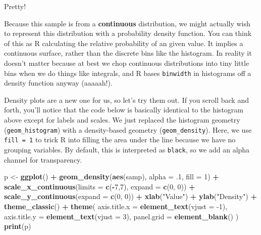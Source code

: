 \documentclass[
]{book}
\newenvironment{Shaded}{\begin{snugshade}}{\end{snugshade}}
\newcommand{\DataTypeTok}[1]{\textcolor[rgb]{0.13,0.29,0.53}{#1}}
\newcommand{\DecValTok}[1]{\textcolor[rgb]{0.00,0.00,0.81}{#1}}
\newcommand{\FloatTok}[1]{\textcolor[rgb]{0.00,0.00,0.81}{#1}}
\newcommand{\KeywordTok}[1]{\textcolor[rgb]{0.13,0.29,0.53}{\textbf{#1}}}
\newcommand{\NormalTok}[1]{#1}
\newcommand{\OperatorTok}[1]{\textcolor[rgb]{0.81,0.36,0.00}{\textbf{#1}}}
\newcommand{\StringTok}[1]{\textcolor[rgb]{0.31,0.60,0.02}{#1}}
\begin{document}
Pretty!

Because this sample is from a \textbf{continuous} distribution, we might actually wish to represent this distribution with a probability density function. You can think of this as R calculating the relative probability of an given value. It implies a continuous surface, rather than the discrete bins like the histogram. In reality it doesn't matter because at best we chop continuous distributions into tiny little bins when we do things like integrals, and R bases \texttt{binwidth} in histograms off a density function anyway (aaaaah!).

Density plots are a new one for us, so let's try them out. If you scroll back and forth, you'll notice that the code below is basically identical to the histogram above except for labels and scales. We just replaced the histogram geometry (\texttt{geom\_histogram}) with a density-based geometry (\texttt{geom\_density}). Here, we use \texttt{fill\ =\ 1} to trick R into filling the area under the line because we have no grouping variables. By default, this is interpreted as \texttt{\textquotesingle{}black\textquotesingle{}}, so we add an alpha channel for transparency.

\begin{Shaded}
\begin{Highlighting}[]
\NormalTok{p <-}\StringTok{ }\KeywordTok{ggplot}\NormalTok{() }\OperatorTok{+}\StringTok{ }
\StringTok{  }\KeywordTok{geom_density}\NormalTok{(}\KeywordTok{aes}\NormalTok{(samp), }\DataTypeTok{alpha =} \FloatTok{.1}\NormalTok{, }\DataTypeTok{fill =} \DecValTok{1}\NormalTok{) }\OperatorTok{+}\StringTok{ }
\StringTok{  }\KeywordTok{scale_x_continuous}\NormalTok{(}\DataTypeTok{limits =} \KeywordTok{c}\NormalTok{(}\OperatorTok{-}\DecValTok{7}\NormalTok{,}\DecValTok{7}\NormalTok{), }\DataTypeTok{expand =} \KeywordTok{c}\NormalTok{(}\DecValTok{0}\NormalTok{, }\DecValTok{0}\NormalTok{)) }\OperatorTok{+}\StringTok{ }
\StringTok{  }\KeywordTok{scale_y_continuous}\NormalTok{(}\DataTypeTok{expand =} \KeywordTok{c}\NormalTok{(}\DecValTok{0}\NormalTok{, }\DecValTok{0}\NormalTok{)) }\OperatorTok{+}\StringTok{ }
\StringTok{  }\KeywordTok{xlab}\NormalTok{(}\StringTok{"Value"}\NormalTok{) }\OperatorTok{+}
\StringTok{  }\KeywordTok{ylab}\NormalTok{(}\StringTok{"Density"}\NormalTok{) }\OperatorTok{+}
\StringTok{  }\KeywordTok{theme_classic}\NormalTok{() }\OperatorTok{+}
\StringTok{  }\KeywordTok{theme}\NormalTok{(}
    \DataTypeTok{axis.title.x =} \KeywordTok{element_text}\NormalTok{(}\DataTypeTok{vjust =} \DecValTok{-1}\NormalTok{),}
    \DataTypeTok{axis.title.y =} \KeywordTok{element_text}\NormalTok{(}\DataTypeTok{vjust =} \DecValTok{3}\NormalTok{),}
    \DataTypeTok{panel.grid =} \KeywordTok{element_blank}\NormalTok{()}
\NormalTok{  )}
\KeywordTok{print}\NormalTok{(p)}
\end{Highlighting}
\end{Shaded}
\end{document}

